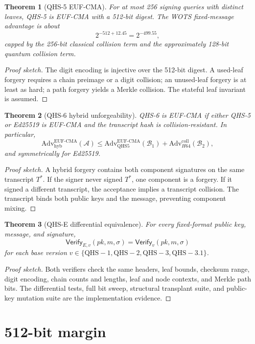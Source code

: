 \documentclass[11pt,a4paper]{article}
\newtheorem{theorem}{Theorem}[section]
\theoremstyle{remark}
\newcommand{\Adv}{\mathrm{Adv}}
\newcommand{\EUF}{\mathrm{EUF\text{-}CMA}}
\newcommand{\coll}{\mathrm{coll}}
\newcommand{\Ver}{\mathsf{Verify}}
\begin{document}
\begin{theorem}[QHS-5 EUF-CMA]
For at most 256 signing queries with distinct leaves, QHS-5 is EUF-CMA with a
512-bit digest. The WOTS fixed-message advantage is about
\[
2^{-512+12.45}=2^{-499.55},
\]
capped by the 256-bit classical collision term and the approximately 128-bit
quantum collision term.
\end{theorem}
\begin{proof}[Proof sketch]
The digit encoding is injective over the 512-bit digest. A used-leaf forgery
requires a chain preimage or a digit collision; an unused-leaf forgery is at
least as hard; a path forgery yields a Merkle collision. The stateful leaf
invariant is assumed.
\end{proof}

\begin{theorem}[QHS-6 hybrid unforgeability]
QHS-6 is EUF-CMA if either QHS-5 or Ed25519 is EUF-CMA and the transcript hash
is collision-resistant. In particular,
\[
\Adv^{\EUF}_{\mathrm{hyb}}(\mathcal{A})
\le
\Adv^{\EUF}_{\mathrm{QHS5}}(\mathcal{B}_1)
+\Adv^{\coll}_{H64}(\mathcal{B}_2),
\]
and symmetrically for Ed25519.
\end{theorem}
\begin{proof}[Proof sketch]
A hybrid forgery contains both component signatures on the same transcript
\(T^*\). If the signer never signed \(T^*\), one component is a forgery. If it
signed a different transcript, the acceptance implies a transcript collision.
The transcript binds both public keys and the message, preventing component
mixing.
\end{proof}

\begin{theorem}[QHS-E differential equivalence]
For every fixed-format public key, message, and signature,
\[
\Ver_{E,v}(pk,m,\sigma)=\Ver_{v}(pk,m,\sigma)
\]
for each base version \(v\in\{\mathrm{QHS-1},\mathrm{QHS-2},\mathrm{QHS-3},\mathrm{QHS-3.1}\}\).
\end{theorem}
\begin{proof}[Proof sketch]
Both verifiers check the same headers, leaf bounds, checksum range, digit
encoding, chain counts and lengths, leaf and node contexts, and Merkle path
bits. The differential tests, full bit sweep, structural transplant suite, and
public-key mutation suite are the implementation evidence.
\end{proof}

\section{512-bit margin}
\end{document}
